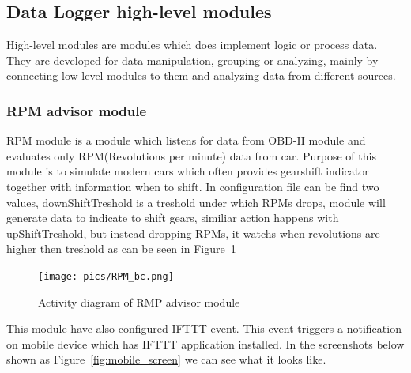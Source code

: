 \subsection{Data Logger high-level modules}

High-level modules are modules which does implement logic or process data. They are developed for data manipulation, grouping or analyzing, mainly by connecting low-level modules to them and analyzing data from different sources.
\subsubsection{RPM advisor module} %
\label{ssub:rpm_module}
RPM module is a module which listens for data from OBD-II module and evaluates only RPM(Revolutions per minute) data from car. Purpose of this module is to simulate modern cars which often provides gearshift indicator together with information when to shift. In configuration file can be find two values, downShiftTreshold is a treshold under which RPMs drops, module will generate data to indicate to shift gears, similiar action happens with upShiftTreshold, but instead dropping RPMs, it watchs when revolutions are higher then treshold as can be seen in Figure~\ref{fig:rmp_pic} 
\begin{figure}[H]
\begin{center}
\captionsetup{font=small}
\texttt{[image: pics/RPM\_bc.png]}
\caption{Activity diagram of RMP advisor module}
\label{fig:rmp_pic}
\end{center}
\end{figure}
This module have also configured IFTTT event. This event triggers a notification on mobile device which has IFTTT application installed. In the screenshots below shown as Figure~\ref{fig:mobile_screen} we can see what it looks like.
